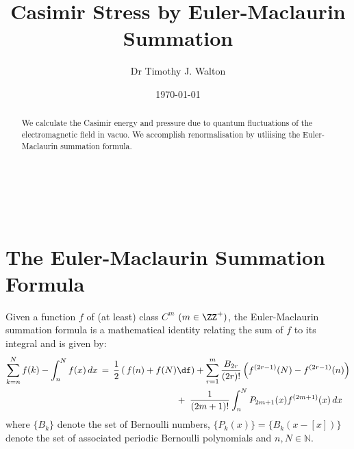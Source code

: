 \documentclass[sections]{tjwNOTES}
\title{Casimir Stress by Euler-Maclaurin Summation}
\author{Dr Timothy J. Walton}
\date{\today}
\begin{document}
\maketitle
\begin{abstract}
	We calculate the Casimir energy and pressure due to quantum fluctuations of the electromagnetic field in vacuo. We accomplish renormalisation by utliising the Euler-Maclaurin summation formula.
\end{abstract}
\makebox[\linewidth]{\rule{\linewidth}{1.2pt}}\\[-1.3cm]
\tableofcontents
\quad \\[-0.2cm]
\makebox[\linewidth]{\rule{\linewidth}{1.pt}}
\section{The Euler-Maclaurin Summation Formula}
\begin{defn}
	Given a function $f$ of (at least) class $C^{m}$ $(m\in\ZZ^{+})$, the Euler-Maclaurin summation formula is a mathematical identity relating the sum of $f$ to its integral and is given by:
	\begin{align}
	\begin{split}\label{EMformula}
		\sum_{k=n}^{N} f(k) - \int_{n}^{N}f(x)\,dx &\,=\, \frac{1}{2}\left(\,f(n) + f(N)\df\right) + \sum_{r=1}^{m}\frac{B_{2r}}{(2r)!}\left(f^{(2r-1)}(N) - f^{(2r-1)}(n)\right) \\
		& \hspace{3cm} + \;\frac{1}{(2m+1)!}\int_{n}^{N} P_{2m+1}(x)f^{(2m+1)}(x) \,dx
	\end{split}
	\end{align}
	where $\{B_{k}\}$ denote the set of Bernoulli numbers, $\{P_{k}(x)\}=\{B_{k}(x-[x])\}$ denote the set of associated periodic Bernoulli polynomials and $n,N\in\mathbb{N}$.
\end{defn}

\end{document}
